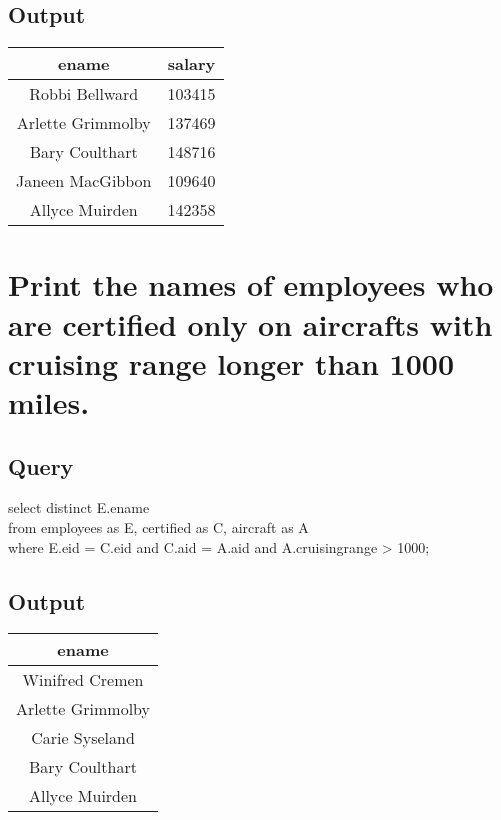 \documentclass[11pt]{scrartcl} %
\begin{document}
\subsection{Output}
\begin{left}
\begin{tabular}{ |c| c| }
\hline
\textbf{ename} & \textbf{salary}\\
\hline
Robbi Bellward &	103415 \\
Arlette Grimmolby &	137469 \\
Bary Coulthart &	148716 \\
Janeen MacGibbon &	109640 \\
Allyce Muirden &	142358 \\
\hline
\end{tabular}
\end{left}





\section{Print the names of employees who are certified only on aircrafts with cruising range longer than 1000 miles. }

\subsection{Query}
select distinct E.ename\\
from employees as E, certified as C, aircraft as A\\
  where E.eid = C.eid and
        C.aid = A.aid and
        A.cruisingrange > 1000;

\subsection{Output}
\begin{left}
\begin{tabular}{ | c | }
\hline
\textbf{ename} \\
\hline
Winifred Cremen\\
Arlette Grimmolby\\
Carie Syseland\\
Bary Coulthart\\
Allyce Muirden\\
\hline
\end{tabular}
\end{left}
\end{document}
